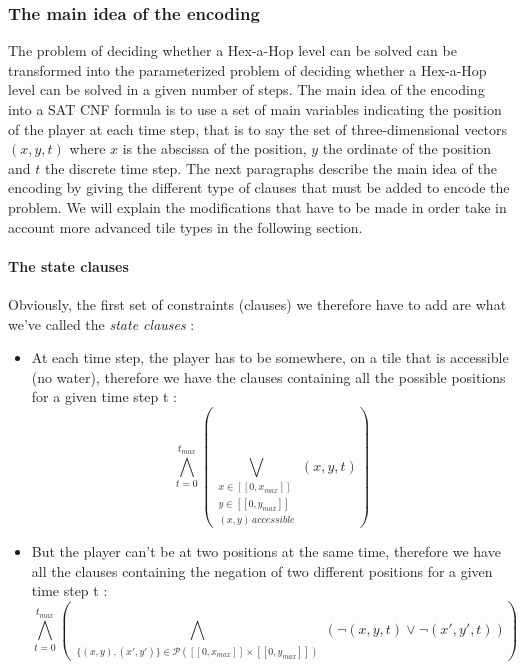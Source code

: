 \documentclass[a4paper, 12pt, titlepage]{article}
\begin{document}
\subsubsection{The main idea of the encoding}
The problem of deciding whether a Hex-a-Hop level can be solved can be
transformed into the parameterized problem of deciding whether a Hex-a-Hop level
can be solved in a given number of steps.
The main idea of the encoding into a SAT CNF formula is to use a set of main
variables indicating the position of the player at each time step, that is to say
the set of three-dimensional vectors $(x, y, t)$ where $x$ is the abscissa of
the position, $y$ the ordinate of the position and $t$ the discrete time step.
The next paragraphs describe the main idea of the encoding by giving the
different type of clauses that must be added to encode the problem. We will
explain the modifications that have to be made in order take in account more
advanced tile types in the following section.

\paragraph{The state clauses}
Obviously, the first set of constraints (clauses) we therefore have to add are
what we've called the {\em state clauses} :
\begin{itemize}
\item At each time step, the player has to be somewhere, on a tile that is
      accessible (no water), therefore we have the clauses containing all the
      possible positions for a given time step t :
      \begin{equation}
      \bigwedge \limits_{t=0}^{t_{max}}
      (\bigvee \limits_{\substack{x \in [\![0, x_{max}]\!]\\
				  y \in [\![0, y_{max}]\!]\\
				  (x, y) \, accessible}}
       (x, y, t))
      \end{equation}

\item But the player can't be at two positions at the same time, therefore we
      have all the clauses containing the negation of two different positions
      for a given time step t :
      \begin{equation}
      \bigwedge \limits_{t=0}^{t_{max}}
      (\bigwedge \limits_{\substack{\{(x, y), (x', y')\} \in
				    \mathcal{P}({[\![0, x_{max}]\!] \times
				    [\![0, y_{max}]\!]})}}
       (\neg(x, y, t) \vee \neg(x', y', t)))
      \end{equation}
\end{itemize}
\end{document}
